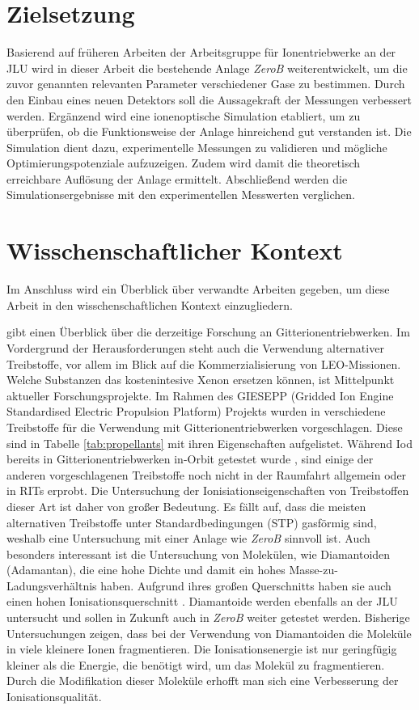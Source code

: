 \section{Zielsetzung}
Basierend auf früheren Arbeiten der Arbeitsgruppe für Ionentriebwerke an der JLU wird in dieser Arbeit die bestehende Anlage \textit{ZeroB} weiterentwickelt, um die zuvor genannten relevanten Parameter verschiedener Gase zu bestimmen. Durch den Einbau eines neuen Detektors soll die Aussagekraft der Messungen verbessert werden. Ergänzend wird eine ionenoptische Simulation etabliert, um zu überprüfen, ob die Funktionsweise der Anlage hinreichend gut verstanden ist. Die Simulation dient dazu, experimentelle Messungen zu validieren und mögliche Optimierungspotenziale aufzuzeigen. Zudem wird damit die theoretisch erreichbare Auflösung der Anlage ermittelt. Abschließend werden die Simulationsergebnisse mit den experimentellen Messwerten verglichen.

\section{Wisschenschaftlicher Kontext}
Im Anschluss wird ein Überblick über verwandte Arbeiten gegeben, um diese Arbeit in den wisschenschaftlichen Kontext einzugliedern.

\cite{ion} gibt einen Überblick über die derzeitige Forschung an Gitterionentriebwerken. Im Vordergrund der Herausforderungen steht auch die Verwendung alternativer Treibstoffe, vor allem im Blick auf die Kommerzialisierung von LEO-Missionen. Welche Substanzen das kostenintesive Xenon ersetzen können, ist Mittelpunkt aktueller Forschungsprojekte. Im Rahmen des GIESEPP (Gridded Ion Engine Standardised Electric Propulsion Platform) Projekts wurden in \cite{Prop} verschiedene Treibstoffe für die Verwendung mit Gitterionentriebwerken vorgeschlagen. Diese sind in Tabelle \ref{tab:propellants} mit ihren Eigenschaften aufgelistet. Während Iod bereits in Gitterionentriebwerken in-Orbit getestet wurde \cite{Iodine}, sind einige der anderen vorgeschlagenen Treibstoffe noch nicht in der Raumfahrt allgemein oder in RITs erprobt. Die Untersuchung der Ionisiationseigenschaften von Treibstoffen dieser Art ist daher von großer Bedeutung. Es fällt auf, dass die meisten alternativen Treibstoffe unter Standardbedingungen (STP) gasförmig sind, weshalb eine Untersuchung mit einer Anlage wie \textit{ZeroB} sinnvoll ist. Auch besonders interessant ist die Untersuchung von Molekülen, wie Diamantoiden (Adamantan), die eine hohe Dichte und damit ein hohes Masse-zu-Ladungsverhältnis haben. Aufgrund ihres großen Querschnitts haben sie auch einen hohen Ionisationsquerschnitt \cite{ion}. Diamantoide werden ebenfalls an der JLU untersucht \cite{diamondoids} und sollen in Zukunft auch in \textit{ZeroB} weiter getestet werden. Bisherige Untersuchungen zeigen, dass bei der Verwendung von Diamantoiden die Moleküle in viele kleinere Ionen fragmentieren. Die Ionisationsenergie ist nur geringfügig kleiner als die Energie, die benötigt wird, um das Molekül zu fragmentieren. Durch die Modifikation dieser Moleküle erhofft man sich eine Verbesserung der Ionisationsqualität. 

